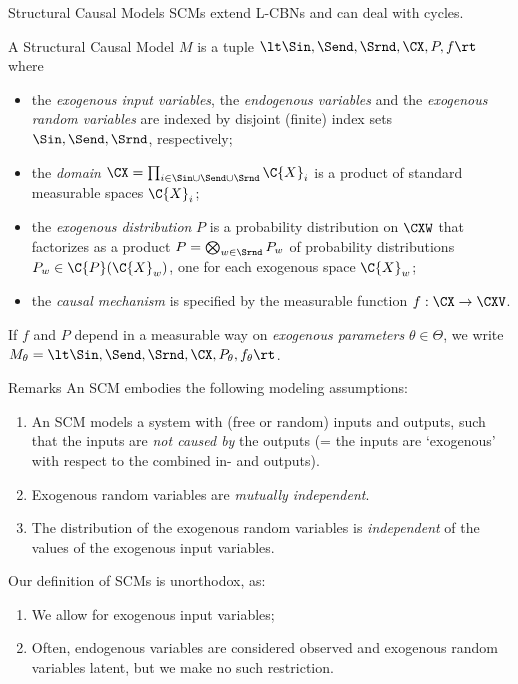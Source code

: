 \begin{frame}{Structural Causal Models}
  SCMs extend L-CBNs and can deal with cycles.
  \begin{Def}[\ref{def:scm}]
  A Structural Causal Model $M$ is a tuple $\lt \Sin, \Send, \Srnd, \CX, P, f \rt$ 
  where
  \begin{itemize}
    \item the \emph{exogenous input variables}, the \emph{endogenous variables} and the \emph{exogenous random variables} are indexed by disjoint (finite) index sets $\Sin, \Send, \Srnd$, respectively;
    \item the \emph{domain} $\CX = \prod_{i\in \Sin \cup \Send \cup \Srnd} \C{X}_i$ is a product of standard measurable spaces $\C{X}_i$;
    \item the \emph{exogenous distribution} $P$ is a probability distribution on $\CXW$ that factorizes as a product $P = \bigotimes_{w\in\Srnd} P_w$ of probability distributions $P_w \in \C{P}(\C{X}_w)$, one for each exogenous space $\C{X}_w$;
    \item the \emph{causal mechanism} is specified by the measurable function $f : \CX \to \CXV$.
  \end{itemize}
\end{Def}
If $f$ and $P$ depend in a measurable way on \emph{exogenous parameters} $\theta\in\Theta$, 
we write $M_{\theta} = \lt \Sin, \Send, \Srnd, \CX, P_{\theta}, f_{\theta} \rt$.
\end{frame}

\begin{frame}{Remarks}
  An SCM embodies the following modeling assumptions:
  \begin{enumerate}
    \item An SCM models a system with (free or random) inputs and outputs, such that the inputs are \emph{not caused by} the outputs (= the inputs are `exogenous' with respect to the combined in- and outputs).
    \item Exogenous random variables are \emph{mutually independent}.
    \item The distribution of the exogenous random variables is \emph{independent} of the values of the exogenous input variables.
  \end{enumerate}

  \bigskip
  Our definition of SCMs is unorthodox, as:
  \begin{enumerate}
    \item We allow for exogenous input variables;
    \item Often, endogenous variables are considered observed and exogenous random variables latent,
      but we make no such restriction.
  \end{enumerate}
\end{frame}

